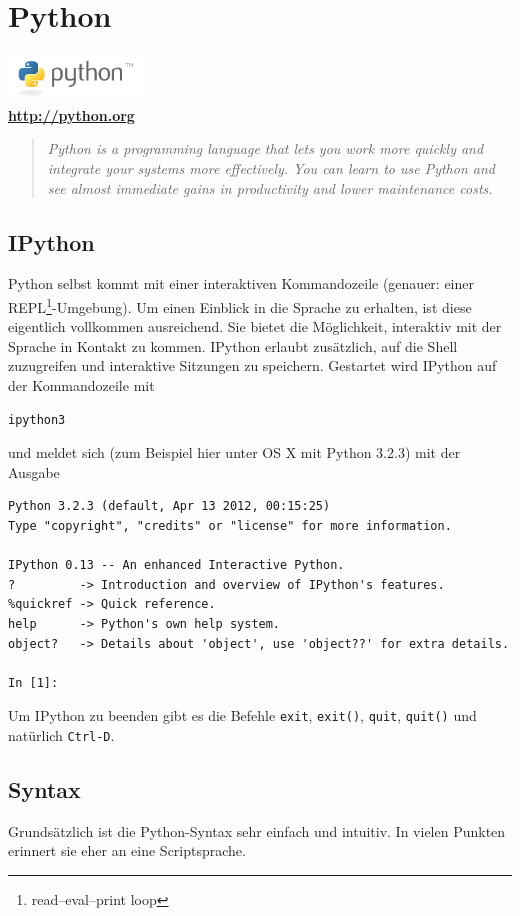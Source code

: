 \chapter{Python}
\begin{center}
  \includegraphics[width=140px]{img/python.png} \\
  \textbf{\url{http://python.org}}
\end{center}
\begin{quote}
  \textit{Python is a programming language that lets you work more quickly and integrate your systems more effectively.
          You can learn to use Python and see almost immediate gains in productivity and lower maintenance costs.}
\end{quote}

\section{IPython}
Python selbst kommt mit einer interaktiven Kommandozeile (genauer: einer REPL\footnote{read–eval–print loop}-Umgebung).
Um einen Einblick in die Sprache zu erhalten, ist diese eigentlich vollkommen ausreichend.
Sie bietet die Möglichkeit, interaktiv mit der Sprache in Kontakt zu kommen.
IPython erlaubt zusätzlich, auf die Shell zuzugreifen und interaktive Sitzungen zu speichern.
Gestartet wird IPython auf der Kommandozeile mit
\begin{verbatim}
ipython3
\end{verbatim}
und meldet sich (zum Beispiel hier unter OS X mit Python 3.2.3) mit der Ausgabe
\begin{verbatim}
Python 3.2.3 (default, Apr 13 2012, 00:15:25) 
Type "copyright", "credits" or "license" for more information.

IPython 0.13 -- An enhanced Interactive Python.
?         -> Introduction and overview of IPython's features.
%quickref -> Quick reference.
help      -> Python's own help system.
object?   -> Details about 'object', use 'object??' for extra details.

In [1]: 
\end{verbatim}
Um IPython zu beenden gibt es die Befehle \texttt{exit}, \texttt{exit()}, \texttt{quit}, \texttt{quit()} und natürlich \texttt{Ctrl-D}.

\section{Syntax}
Grundsätzlich ist die Python-Syntax sehr einfach und intuitiv.
In vielen Punkten erinnert sie eher an eine Scriptsprache.

